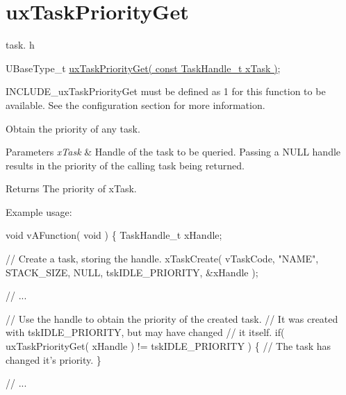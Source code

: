 \hypertarget{group__ux_task_priority_get}{}\section{ux\+Task\+Priority\+Get}
\label{group__ux_task_priority_get}
task. h 
\begin{DoxyPre}
UBaseType\_t \hyperlink{externals_2freertos_2include_2task_8h_a18d1148c845f5c4bff3b9e5b2077e058}{uxTaskPriorityGet( const TaskHandle\_t xTask )};
\end{DoxyPre}


I\+N\+C\+L\+U\+D\+E\+\_\+ux\+Task\+Priority\+Get must be defined as 1 for this function to be available. See the configuration section for more information.

Obtain the priority of any task.


\begin{DoxyParams}{Parameters}
{\em x\+Task} & Handle of the task to be queried. Passing a N\+U\+LL handle results in the priority of the calling task being returned.\\
\hline
\end{DoxyParams}
\begin{DoxyReturn}{Returns}
The priority of x\+Task.
\end{DoxyReturn}
Example usage\+: 
\begin{DoxyPre}
void vAFunction( void )
\{
TaskHandle\_t xHandle;\end{DoxyPre}



\begin{DoxyPre}  // Create a task, storing the handle.
  xTaskCreate( vTaskCode, "NAME", STACK\_SIZE, NULL, tskIDLE\_PRIORITY, \&xHandle );\end{DoxyPre}



\begin{DoxyPre}  // ...\end{DoxyPre}



\begin{DoxyPre}  // Use the handle to obtain the priority of the created task.
  // It was created with tskIDLE\_PRIORITY, but may have changed
  // it itself.
  if( uxTaskPriorityGet( xHandle ) != tskIDLE\_PRIORITY )
  \{
      // The task has changed it's priority.
  \}\end{DoxyPre}



\begin{DoxyPre}  // ...\end{DoxyPre}



